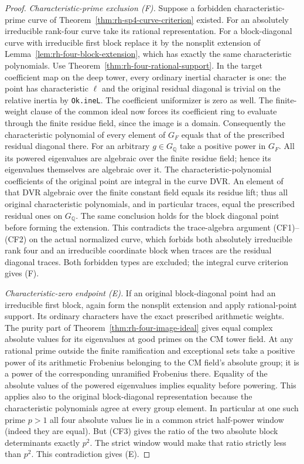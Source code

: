 \begin{proof}
\emph{Characteristic-prime exclusion (F).}
Suppose a forbidden characteristic-prime curve
of Theorem~\ref{thm:rh-sp4-curve-criterion} existed.
For an absolutely irreducible rank-four curve
take its rational representation. For a
block-diagonal curve with irreducible first
block replace it by the nonsplit extension of
Lemma~\ref{lem:rh-four-block-extension}, which
has exactly the same characteristic polynomials.
Use Theorem~\ref{thm:rh-four-rational-support}.
In the target coefficient map on the deep tower,
every ordinary inertial character is one: the
point has characteristic $\ell$ and the original
residual diagonal is trivial on the relative
inertia by \texttt{Ok.ineL}. The coefficient
uniformizer is zero as well. The finite-weight
clause of the common ideal now forces its
coefficient ring to evaluate through the finite
residue field, since the image is a domain.
Consequently the characteristic polynomial of
every element of $G_F$ equals that of the
prescribed residual diagonal there. For an
arbitrary $g\in G_{\mathbb Q}$ take a positive
power in $G_F$. All its powered eigenvalues
are algebraic over the finite residue field;
hence its eigenvalues themselves are algebraic
over it. The characteristic-polynomial
coefficients of the original point are integral
in the curve DVR. An element of that DVR
algebraic over the finite constant field equals
its residue lift; thus all original characteristic
polynomials, and in particular traces, equal
the prescribed residual ones on $G_{\mathbb Q}$.
The same conclusion holds for the block
diagonal point before forming the extension.
This contradicts the trace-algebra argument
(CF1)--(CF2) on the actual normalized curve,
which forbids both absolutely irreducible rank
four and an irreducible coordinate block when
traces are the residual diagonal traces. Both
forbidden types are excluded; the integral
curve criterion gives (F).

\emph{Characteristic-zero endpoint (E).}
If an original block-diagonal point had an
irreducible first block, again form the nonsplit
extension and apply rational-point support.
Its ordinary characters have the exact
prescribed arithmetic weights. The purity
part of Theorem~\ref{thm:rh-four-image-ideal}
gives equal complex absolute values for its
eigenvalues at good primes on the CM tower
field. At any rational prime outside the
finite ramification and exceptional sets take
a positive power of its arithmetic Frobenius
belonging to the CM field's absolute group;
it is a power of the corresponding unramified
Frobenius there. Equality of the absolute
values of the powered eigenvalues implies
equality before powering. This applies also
to the original block-diagonal representation
because the characteristic polynomials agree
at every group element. In particular at one
such prime $p>1$ all four absolute values
lie in a common strict half-power window
(indeed they are equal). But (CF3) gives
the ratio of the two absolute block
determinants exactly $p^2$. The strict
window would make that ratio strictly
less than $p^2$. This contradiction gives
(E).


\end{proof}
